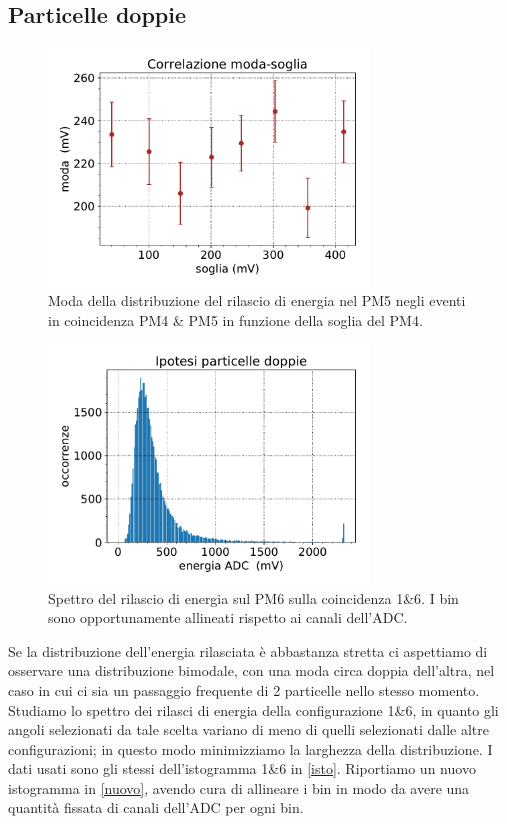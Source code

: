 \subsection{Particelle doppie}

\begin{figure}
	\centering
	\includegraphics[width=23em]{doppie}
	\caption{Moda della distribuzione del rilascio di energia nel PM5
	negli eventi in coincidenza PM4 \& PM5
	in funzione della soglia del PM4.}
	\label{corre}
\end{figure}

\begin{figure}
	\centering
	\includegraphics[width=23em]{nuovo}
	\caption{Spettro del rilascio di energia sul PM6 sulla coincidenza 1\&6.
	I bin sono opportunamente allineati rispetto ai canali dell'ADC.}
	\label{nuovo}
\end{figure}

Se la distribuzione dell'energia rilasciata è abbastanza stretta
ci aspettiamo di osservare una distribuzione bimodale,
con una moda circa doppia dell'altra,
nel caso in cui ci sia un passaggio frequente di 2 particelle nello stesso momento.
Studiamo lo spettro dei rilasci di energia della configurazione 1\&6,
in quanto gli angoli selezionati da tale scelta variano di meno di quelli selezionati dalle altre configurazioni;
in questo modo minimizziamo la larghezza della distribuzione.
I dati usati sono gli stessi dell'istogramma 1\&6 in \autoref{isto}.
Riportiamo un nuovo istogramma in \autoref{nuovo},
avendo cura di allineare i bin in modo da avere una quantità fissata di canali dell'ADC per ogni bin.

